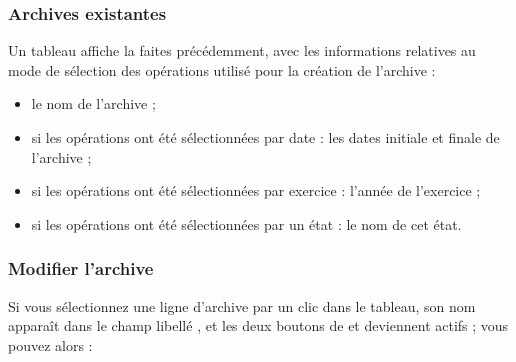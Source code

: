 \subsubsection{Archives existantes\label{setup-general-archives-existing}}

Un tableau affiche la  faites précédemment, avec les informations relatives au mode de sélection des opérations utilisé pour la création de l'archive :

\begin{itemize}
	\item le nom de l'archive ;
	\item si les opérations ont été sélectionnées par date : les dates initiale et finale de l'archive ;
	\item si les opérations ont été sélectionnées par exercice : l'année de l'exercice ;	
	\item si les opérations ont été sélectionnées par un état : le nom de cet état.
	\end{itemize}	


\subsubsection{Modifier l'archive\label{setup-general-archives-remove}}

Si vous sélectionnez une ligne d'archive par un clic dans le tableau, son nom apparaît dans le champ libellé , et les deux boutons de   et  deviennent actifs ; vous pouvez alors :

